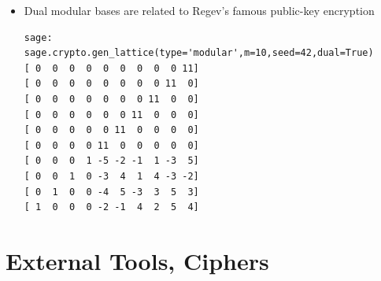 \documentclass[10pt]{beamer}
\begin{document}
\begin{frame}
\begin{itemize}
\begin{lstlisting}
[ 3  3  4 -2  0  0  1  0]
[ 2  3  3  4  0  0  0  1]
\end{lstlisting}
\framebreak
\item Dual modular bases are related to Regev's famous public-key encryption
\begin{lstlisting}
sage: sage.crypto.gen_lattice(type='modular',m=10,seed=42,dual=True)
[ 0  0  0  0  0  0  0  0  0 11]
[ 0  0  0  0  0  0  0  0 11  0]
[ 0  0  0  0  0  0  0 11  0  0]
[ 0  0  0  0  0  0 11  0  0  0]
[ 0  0  0  0  0 11  0  0  0  0]
[ 0  0  0  0 11  0  0  0  0  0]
[ 0  0  0  1 -5 -2 -1  1 -3  5]
[ 0  0  1  0 -3  4  1  4 -3 -2]
[ 0  1  0  0 -4  5 -3  3  5  3]
[ 1  0  0  0 -2 -1  4  2  5  4]
\end{lstlisting}
\end{itemize}

\end{frame}

\section{External Tools, Ciphers}
\end{document}
